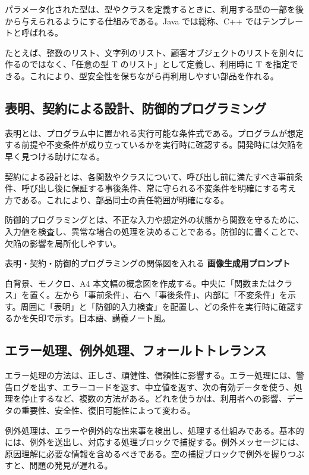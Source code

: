 \documentclass[a4paper,11pt,ja=standard,xelatex]{bxjsarticle}
\begin{document}
パラメータ化された型は、型やクラスを定義するときに、利用する型の一部を後から与えられるようにする仕組みである。Java では総称、C++ ではテンプレートと呼ばれる。

たとえば、整数のリスト、文字列のリスト、顧客オブジェクトのリストを別々に作るのではなく、「任意の型 T のリスト」として定義し、利用時に T を指定できる。これにより、型安全性を保ちながら再利用しやすい部品を作れる。

\subsection{表明、契約による設計、防御的プログラミング}

表明とは、プログラム中に置かれる実行可能な条件式である。プログラムが想定する前提や不変条件が成り立っているかを実行時に確認する。開発時には欠陥を早く見つける助けになる。

契約による設計とは、各関数やクラスについて、呼び出し前に満たすべき事前条件、呼び出し後に保証する事後条件、常に守られる不変条件を明確にする考え方である。これにより、部品同士の責任範囲が明確になる。

防御的プログラミングとは、不正な入力や想定外の状態から関数を守るために、入力値を検査し、異常な場合の処理を決めることである。防御的に書くことで、欠陥の影響を局所化しやすい。

\begin{todobox}{表明・契約・防御的プログラミングの関係図を入れる}
\textbf{画像生成用プロンプト}

白背景、モノクロ、A4 本文幅の概念図を作成する。中央に「関数またはクラス」を置く。左から「事前条件」、右へ「事後条件」、内部に「不変条件」を示す。周囲に「表明」と「防御的入力検査」を配置し、どの条件を実行時に確認するかを矢印で示す。日本語、講義ノート風。
\end{todobox}

\subsection{エラー処理、例外処理、フォールトトレランス}

エラー処理の方法は、正しさ、頑健性、信頼性に影響する。エラー処理には、警告ログを出す、エラーコードを返す、中立値を返す、次の有効データを使う、処理を停止するなど、複数の方法がある。どれを使うかは、利用者への影響、データの重要性、安全性、復旧可能性によって変わる。

例外処理は、エラーや例外的な出来事を検出し、処理する仕組みである。基本的には、例外を送出し、対応する処理ブロックで捕捉する。例外メッセージには、原因理解に必要な情報を含めるべきである。空の捕捉ブロックで例外を握りつぶすと、問題の発見が遅れる。
\end{document}
